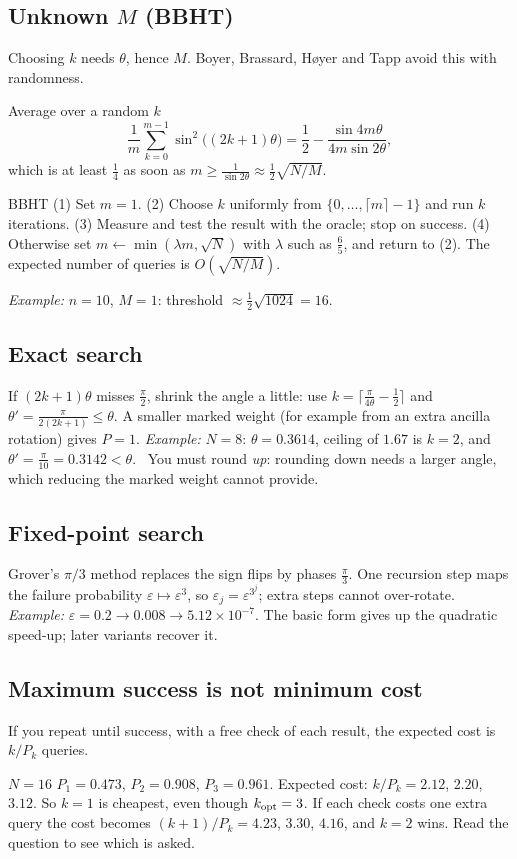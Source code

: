 \documentclass[11pt,a4paper,openany]{book}
\newcounter{wex}[section]
\newcommand{\kopt}{k_{\rm opt}}
\begin{document}
\subsection{Unknown $M$ (BBHT)}
Choosing $k$ needs $\theta$, hence $M$. Boyer, Brassard, H{\o}yer and Tapp avoid this with randomness.
\begin{keyres}{Average over a random $k$}
\[ \frac1m\sum_{k=0}^{m-1}\sin^2\big((2k+1)\theta\big) = \frac12 - \frac{\sin4m\theta}{4m\sin2\theta}, \]
which is at least $\frac14$ as soon as $m \ge \frac{1}{\sin2\theta} \approx \frac12\sqrt{N/M}$.
\end{keyres}
\begin{method}{BBHT}
(1) Set $m = 1$. (2) Choose $k$ uniformly from $\{0, \dots, \lceil m\rceil - 1\}$ and run $k$ iterations. (3) Measure and test the result with the oracle; stop on success. (4) Otherwise set $m \leftarrow \min(\lambda m, \sqrt N)$ with $\lambda$ such as $\frac65$, and return to (2). The expected number of queries is $O(\sqrt{N/M})$.
\end{method}
\emph{Example:} $n = 10$, $M = 1$: threshold $\approx \frac12\sqrt{1024} = 16$.

\subsection{Exact search}
If $(2k+1)\theta$ misses $\frac\pi2$, shrink the angle a little: use $k = \lceil\frac{\pi}{4\theta} - \frac12\rceil$ and $\theta' = \frac{\pi}{2(2k+1)} \le \theta$. A smaller marked weight (for example from an extra ancilla rotation) gives $P = 1$.
\emph{Example:} $N = 8$: $\theta = 0.3614$, ceiling of $1.67$ is $k = 2$, and $\theta' = \frac{\pi}{10} = 0.3142 < \theta$. \checkmark\ You must round \emph{up}: rounding down needs a larger angle, which reducing the marked weight cannot provide.

\subsection{Fixed-point search}
Grover's $\pi/3$ method replaces the sign flips by phases $\frac\pi3$. One recursion step maps the failure probability $\varepsilon \mapsto \varepsilon^3$, so $\varepsilon_j = \varepsilon^{3^j}$; extra steps cannot over-rotate. \emph{Example:} $\varepsilon = 0.2 \to 0.008 \to 5.12\times10^{-7}$. The basic form gives up the quadratic speed-up; later variants recover it.

\subsection{Maximum success is not minimum cost}
If you repeat until success, with a free check of each result, the expected cost is $k/P_k$ queries.
\begin{wexample}{$N = 16$}
$P_1 = 0.473$, $P_2 = 0.908$, $P_3 = 0.961$. Expected cost: $k/P_k = 2.12$, $2.20$, $3.12$. So $k = 1$ is cheapest, even though $\kopt = 3$. If each check costs one extra query the cost becomes $(k+1)/P_k = 4.23$, $3.30$, $4.16$, and $k = 2$ wins. Read the question to see which is asked.
\end{wexample}
\end{document}
